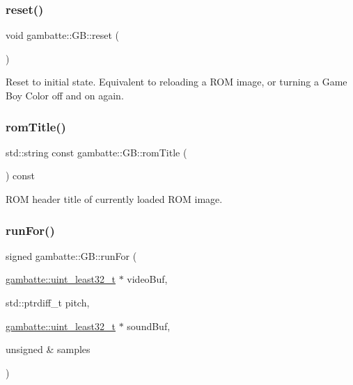 \mbox{\label{classgambatte_1_1GB_a765c0a392c9801ab094936f2978b5000}} 
\subsubsection{\texorpdfstring{reset()}{reset()}}
{\footnotesize\ttfamily void gambatte\+::\+G\+B\+::reset (\begin{DoxyParamCaption}{ }\end{DoxyParamCaption})}

Reset to initial state. Equivalent to reloading a R\+OM image, or turning a Game Boy Color off and on again. \mbox{\label{classgambatte_1_1GB_ad3eeb7e32908992b471c44936f05f8ea}} 
\subsubsection{\texorpdfstring{rom\+Title()}{romTitle()}}
{\footnotesize\ttfamily std\+::string const gambatte\+::\+G\+B\+::rom\+Title (\begin{DoxyParamCaption}{ }\end{DoxyParamCaption}) const}

R\+OM header title of currently loaded R\+OM image. \mbox{\label{classgambatte_1_1GB_a10d409c2865b9c9770bf2a19f6d77dd7}} 
\subsubsection{\texorpdfstring{run\+For()}{runFor()}}
{\footnotesize\ttfamily signed gambatte\+::\+G\+B\+::run\+For (\begin{DoxyParamCaption}\item[{\hyperlink{namespacegambatte_a0639f09fccfbbd5a8e0796318768e370}{gambatte\+::uint\+\_\+least32\+\_\+t} $\ast$}]{video\+Buf,  }\item[{std\+::ptrdiff\+\_\+t}]{pitch,  }\item[{\hyperlink{namespacegambatte_a0639f09fccfbbd5a8e0796318768e370}{gambatte\+::uint\+\_\+least32\+\_\+t} $\ast$}]{sound\+Buf,  }\item[{unsigned \&}]{samples }\end{DoxyParamCaption})}

